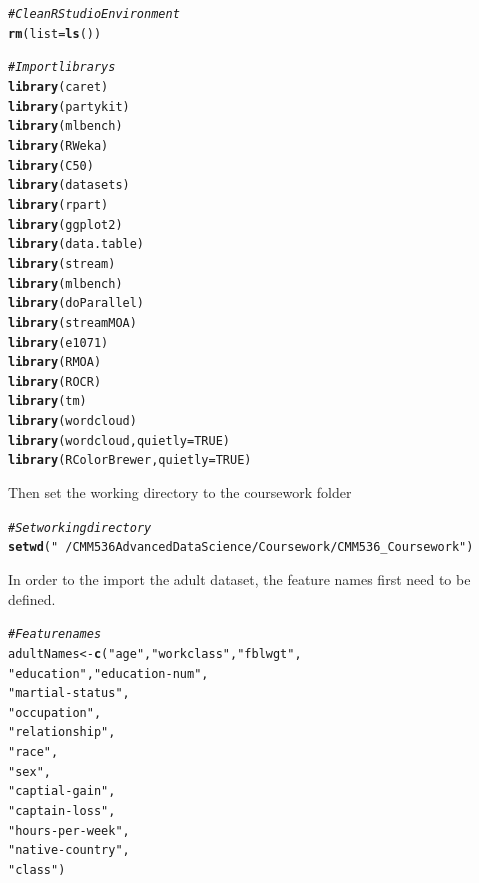 \documentclass[10pt  ,usenames, dvipsnames]{article}\usepackage[]{graphicx}\usepackage[]{color}
\makeatletter
\newcommand{\hlnum}[1]{\textcolor[rgb]{0.686,0.059,0.569}{#1}}%
\newcommand{\hlstr}[1]{\textcolor[rgb]{0.192,0.494,0.8}{#1}}%
\newcommand{\hlcom}[1]{\textcolor[rgb]{0.678,0.584,0.686}{\textit{#1}}}%
\newcommand{\hlstd}[1]{\textcolor[rgb]{0.345,0.345,0.345}{#1}}%
\newcommand{\hlkwb}[1]{\textcolor[rgb]{0.69,0.353,0.396}{#1}}%
\newcommand{\hlkwc}[1]{\textcolor[rgb]{0.333,0.667,0.333}{#1}}%
\newcommand{\hlkwd}[1]{\textcolor[rgb]{0.737,0.353,0.396}{\textbf{#1}}}%
\newenvironment{kframe}{%
 \def\at@end@of@kframe{}%
 \ifinner\ifhmode%
  \def\at@end@of@kframe{\end{minipage}}%
  \begin{minipage}{\columnwidth}%
 \fi\fi%
 \def\FrameCommand##1{\hskip\@totalleftmargin \hskip-\fboxsep
 \colorbox{shadecolor}{##1}\hskip-\fboxsep
     \hskip-\linewidth \hskip-\@totalleftmargin \hskip\columnwidth}%
 \MakeFramed {\advance\hsize-\width
   \@totalleftmargin\z@ \linewidth\hsize
   \@setminipage}}%
 {\par\unskip\endMakeFramed%
 \at@end@of@kframe}
\newenvironment{knitrout}{}{} %
\makeatother
\begin{document}
\begin{knitrout}
\color{fgcolor}\begin{kframe}
\begin{alltt}
\hlcom{#Clean RStudio Environment}
\hlkwd{rm}\hlstd{(}\hlkwc{list} \hlstd{=} \hlkwd{ls}\hlstd{())}

\hlcom{#Import librarys}
\hlkwd{library}\hlstd{(caret)}
\hlkwd{library}\hlstd{(partykit)}
\hlkwd{library}\hlstd{(mlbench)}
\hlkwd{library}\hlstd{(RWeka)}
\hlkwd{library}\hlstd{(C50)}
\hlkwd{library}\hlstd{(datasets)}
\hlkwd{library}\hlstd{(rpart)}
\hlkwd{library}\hlstd{(ggplot2)}
\hlkwd{library}\hlstd{(data.table)}
\hlkwd{library}\hlstd{(stream)}
\hlkwd{library}\hlstd{(mlbench)}
\hlkwd{library}\hlstd{(doParallel)}
\hlkwd{library}\hlstd{(streamMOA)}
\hlkwd{library}\hlstd{(e1071)}
\hlkwd{library}\hlstd{(RMOA)}
\hlkwd{library}\hlstd{(ROCR)}
\hlkwd{library}\hlstd{(tm)}
\hlkwd{library}\hlstd{(wordcloud)}
\hlkwd{library}\hlstd{(wordcloud,}\hlkwc{quietly}\hlstd{=}\hlnum{TRUE}\hlstd{)}
\hlkwd{library}\hlstd{(RColorBrewer,}\hlkwc{quietly}\hlstd{=}\hlnum{TRUE}\hlstd{)}
\end{alltt}
\end{kframe}
\end{knitrout}



Then set the working directory to the coursework folder

\begin{knitrout}
\color{fgcolor}\begin{kframe}
\begin{alltt}
\hlcom{#Set working directory}
\hlkwd{setwd}\hlstd{(}\hlstr{"~/CMM536 Advanced Data Science/Coursework/CMM536_Coursework"}\hlstd{)}
\end{alltt}
\end{kframe}
\end{knitrout}



\clearpage

In order to the import the adult dataset, the feature names first need to be defined.
\begin{knitrout}
\color{fgcolor}\begin{kframe}
\begin{alltt}
\hlcom{#Feature names}
\hlstd{adultNames} \hlkwb{<-} \hlkwd{c}\hlstd{(}\hlstr{"age"}\hlstd{,} \hlstr{"workclass"}\hlstd{,} \hlstr{"fblwgt"}\hlstd{,}
                \hlstr{"education"}\hlstd{,} \hlstr{"education-num"}\hlstd{,}
                \hlstr{"martial-status"}\hlstd{,}
                \hlstr{"occupation"}\hlstd{,}
                \hlstr{"relationship"}\hlstd{,}
                \hlstr{"race"}\hlstd{,}
                \hlstr{"sex"}\hlstd{,}
                \hlstr{"captial-gain"}\hlstd{,}
                \hlstr{"captain-loss"}\hlstd{,}
                \hlstr{"hours-per-week"}\hlstd{,}
                \hlstr{"native-country"}\hlstd{,}
                \hlstr{"class"}\hlstd{)}
\end{alltt}
\end{kframe}
\end{knitrout}
\end{document}
